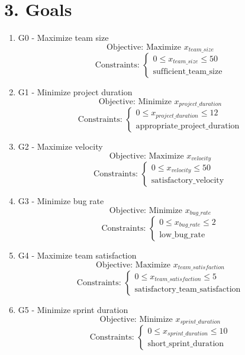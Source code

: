 \documentclass{article}
\begin{document}
\section{3. Goals}
\begin{enumerate}
    \item G0 - Maximize team size
        \[
        \text{Objective: Maximize } x_{team\_size}
        \]
        \[
        \text{Constraints: }
        \begin{cases}
            0 \leq x_{team\_size} \leq 50 \\
            \text{sufficient\_team\_size}
        \end{cases}
        \]
    \item G1 - Minimize project duration
        \[
        \text{Objective: Minimize } x_{project\_duration}
        \]
        \[
        \text{Constraints: }
        \begin{cases}
            0 \leq x_{project\_duration} \leq 12 \\
            \text{appropriate\_project\_duration}
        \end{cases}
        \]
    \item G2 - Maximize velocity
        \[
        \text{Objective: Maximize } x_{velocity}
        \]
        \[
        \text{Constraints: }
        \begin{cases}
            0 \leq x_{velocity} \leq 50 \\
            \text{satisfactory\_velocity}
        \end{cases}
        \]
    \item G3 - Minimize bug rate
        \[
        \text{Objective: Minimize } x_{bug\_rate}
        \]
        \[
        \text{Constraints: }
        \begin{cases}
            0 \leq x_{bug\_rate} \leq 2 \\
            \text{low\_bug\_rate}
        \end{cases}
        \]
    \item G4 - Maximize team satisfaction
        \[
        \text{Objective: Maximize } x_{team\_satisfaction}
        \]
        \[
        \text{Constraints: }
        \begin{cases}
            0 \leq x_{team\_satisfaction} \leq 5 \\
            \text{satisfactory\_team\_satisfaction}
        \end{cases}
        \]
    \item G5 - Minimize sprint duration
        \[
        \text{Objective: Minimize } x_{sprint\_duration}
        \]
        \[
        \text{Constraints: }
        \begin{cases}
            0 \leq x_{sprint\_duration} \leq 10 \\
            \text{short\_sprint\_duration}
        \end{cases}
        \]
\end{enumerate}
\end{document}
